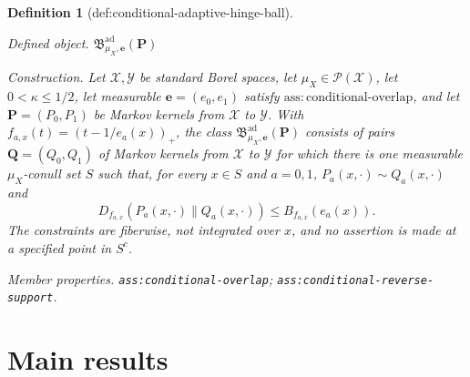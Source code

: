 \documentclass{article}
\newtheorem{definition}{Definition}
\begin{document}
\begin{definition}[def:conditional-adaptive-hinge-ball]\label{def:conditional-adaptive-hinge-ball}
\par\smallskip\noindent\emph{Defined object.} \(\mathfrak B^{\mathrm{ad}}_{\mu_X,\boldsymbol e}(\boldsymbol P)\)
\par\smallskip\noindent\emph{Construction.} Let \(\mathcal X,\mathcal Y\) be standard Borel spaces, let \(\mu_X\in\mathcal P(\mathcal X)\), let \(0<\kappa\le1/2\), let measurable \(\boldsymbol e=(e_0,e_1)\) satisfy \(\mathrm{ass:conditional\text{-}overlap}\), and let \(\boldsymbol P=(P_0,P_1)\) be Markov kernels from \(\mathcal X\) to \(\mathcal Y\).  With \(f_{a,x}(t)=(t-1/e_a(x))_+\), the class \(\mathfrak B^{\mathrm{ad}}_{\mu_X,\boldsymbol e}(\boldsymbol P)\) consists of pairs \(\boldsymbol Q=(Q_0,Q_1)\) of Markov kernels from \(\mathcal X\) to \(\mathcal Y\) for which there is one measurable \(\mu_X\)-conull set \(S\) such that, for every \(x\in S\) and \(a=0,1\), \(P_a(x,\cdot)\sim Q_a(x,\cdot)\) and
\[
 D_{f_{a,x}}(P_a(x,\cdot)\|Q_a(x,\cdot))\le B_{f_{a,x}}(e_a(x)).
\]
The constraints are fiberwise, not integrated over \(x\), and no assertion is made at a specified point in \(S^c\).
\par\smallskip\noindent\emph{Member properties.} \texttt{ass:\allowbreak{}conditional-\allowbreak{}overlap}; \texttt{ass:\allowbreak{}conditional-\allowbreak{}reverse-\allowbreak{}support}.
\end{definition}

\section{Main results}
\end{document}
